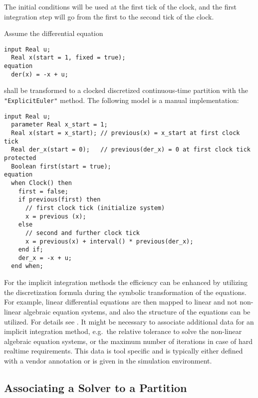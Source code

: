 The initial conditions will be used at the first tick of the clock, and
the first integration step will go from the first to the second tick of
the clock.

\begin{example}
Assume the differential equation
\begin{lstlisting}[language=modelica]
  input Real u;
  Real x(start = 1, fixed = true);
equation
  der(x) = -x + u;
\end{lstlisting}
shall be transformed to a clocked discretized continuous-time partition with the \lstinline!"ExplicitEuler"! method.  The following model is a manual implementation:
\begin{lstlisting}[language=modelica]
  input Real u;
  parameter Real x_start = 1;
  Real x(start = x_start); // previous(x) = x_start at first clock tick
  Real der_x(start = 0);   // previous(der_x) = 0 at first clock tick
protected
  Boolean first(start = true);
equation
  when Clock() then
    first = false;
    if previous(first) then
      // first clock tick (initialize system)
      x = previous (x);
    else
      // second and further clock tick
      x = previous(x) + interval() * previous(der_x);
    end if;
    der_x = -x + u;
  end when;
\end{lstlisting}
\end{example}

\begin{nonnormative}
For the implicit integration methods the efficiency can be enhanced by utilizing the discretization formula during the symbolic transformation of the equations.
For example, linear differential equations are then mapped to linear and not non-linear algebraic equation systems, and also the structure of the equations can be utilized.
For details see \textcite{ElmqvistOtterCellier1995InlineIntegration}.
It might be necessary to associate additional data for an implicit integration method, e.g.\ the relative tolerance to solve the non-linear algebraic equation systems, or the maximum number of iterations in case of hard realtime requirements.
This data is tool specific and is typically either defined with a vendor annotation or is given in the simulation environment.
\end{nonnormative}

\subsection{Associating a Solver to a Partition}\label{associating-a-solver-to-a-partition}

